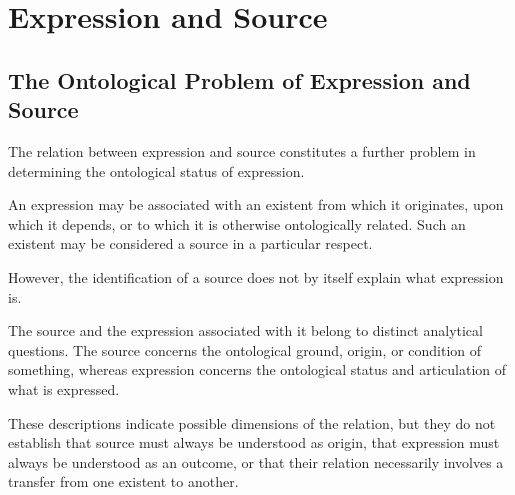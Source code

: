 %
%

\section{Expression and Source}
\label{sec:expression-and-source}

\subsection{The Ontological Problem of Expression and Source}

The relation between expression and source constitutes
a further problem in determining the ontological status
of expression.

An expression may be associated with an existent
from which it originates, upon which it depends,
or to which it is otherwise ontologically related.
Such an existent may be considered a source in a
particular respect.

However, the identification of a source does not
by itself explain what expression is.

The source and the expression associated with it
belong to distinct analytical questions. The source
concerns the ontological ground, origin, or condition
of something, whereas expression concerns the
ontological status and articulation of what is
expressed.

These descriptions indicate possible dimensions
of the relation, but they do not establish that
source must always be understood as origin, that
expression must always be understood as an outcome,
or that their relation necessarily involves a
transfer from one existent to another.

